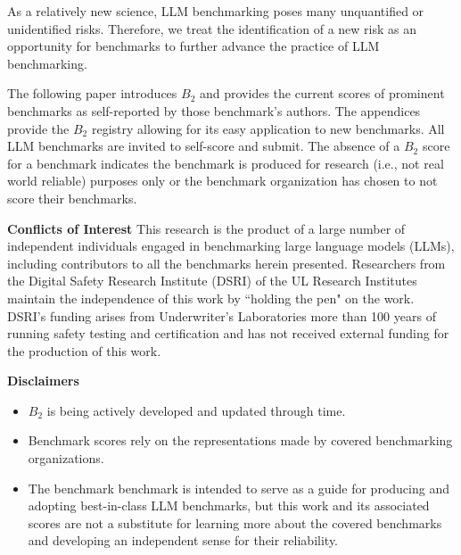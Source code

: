\documentclass{article}
\newcommand\bb{$B_2$ }
\begin{document}
As a relatively new science, LLM benchmarking poses many unquantified or unidentified risks. Therefore, we treat the identification of a new risk as an opportunity for benchmarks to further advance the practice of LLM benchmarking.

The following paper introduces \bb and provides the current scores of prominent benchmarks as self-reported by those benchmark's authors. The appendices provide the \bb registry allowing for its easy application to new benchmarks. All LLM benchmarks are invited to self-score and submit. The absence of a \bb score for a benchmark indicates the benchmark is produced for research (i.e., not real world reliable) purposes only or the benchmark organization has chosen to not score their benchmarks. 

\begin{center}
    \begin{tcolorbox}[colback=blue!10, colframe=blue!50, width=\textwidth, boxrule=0.5mm, sharp corners, coltext=black, halign=left]
        \textbf{Conflicts of Interest}
This research is the product of a large number of independent individuals engaged in benchmarking large language models (LLMs), including contributors to all the benchmarks herein presented. Researchers from the Digital Safety Research Institute (DSRI) of the UL Research Institutes maintain the independence of this work by ``holding the pen" on the work. DSRI's funding arises from Underwriter's Laboratories more than 100 years of running safety testing and certification and has not received external funding for the production of this work.
\end{tcolorbox}
\end{center}

\begin{center}
    \begin{tcolorbox}[colback=blue!10, colframe=blue!50, width=\textwidth, boxrule=0.5mm, sharp corners, coltext=black, halign=left]
\textbf{Disclaimers}
\begin{itemize}
\item \bb is being actively developed and updated through time.
\item Benchmark scores rely on the representations made by covered benchmarking organizations.
\item The benchmark benchmark is intended to serve as a guide for producing and adopting best-in-class LLM benchmarks, but this work and its associated scores are not a substitute for learning more about the covered benchmarks and developing an independent sense for their reliability.
\end{itemize}
    \end{tcolorbox}
\end{center}
\end{document}
